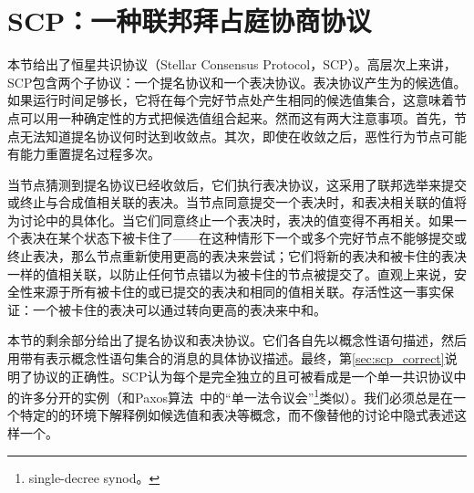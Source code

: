 \section{SCP：一种联邦拜占庭协商协议}\label{sec:scp}

本节给出了恒星共识协议（Stellar Consensus Protocol，SCP）。高层次上来讲，SCP包含两个子协议：一个提名协议和一个表决协议。表决协议产生为{\slot}的候选值。如果运行时间足够长，它将在每个完好节点处产生相同的候选值集合，这意味着节点可以用一种确定性的方式把候选值组合起来。然而这有两大注意事项。首先，节点无法知道提名协议何时达到收敛点。其次，即使在收敛之后，恶性行为节点可能有能力重置提名过程多次。

当节点猜测到提名协议已经收敛后，它们执行表决协议，这采用了联邦选举来提交或终止与合成值相关联的表决。当节点同意提交一个表决时，和表决相关联的值将为讨论中的{\slot}具体化。当它们同意终止一个表决时，表决的值变得不再相关。如果一个表决在某个状态下被卡住了——在这种情形下一个或多个完好节点不能够提交或终止表决，那么节点重新使用更高的表决来尝试；它们将新的表决和被卡住的表决一样的值相关联，以防止任何节点错以为被卡住的节点被提交了。直观上来说，安全性来源于所有被卡住的或已提交的表决和相同的值相关联。存活性这一事实保证：一个被卡住的表决可以通过转向更高的表决来中和。

本节的剩余部分给出了提名协议和表决协议。它们各自先以概念性语句描述，然后用带有表示概念性语句集合的消息的具体协议描述。最终，第\ref{sec:scp_correct}说明了协议的正确性。SCP认为每个{\slot}是完全独立的且可被看成是一个单一{\slot}共识协议中的许多分开的实例（和Paxos算法~\cite{Lamport:1998:PP:279227.279229}中的``单一法令议会''\footnote{single-decree synod。}类似）。我们必须总是在一个特定的{\slot}的环境下解释例如候选值和表决等概念，而不像替他的讨论中隐式表述这样一个{\slot}。



